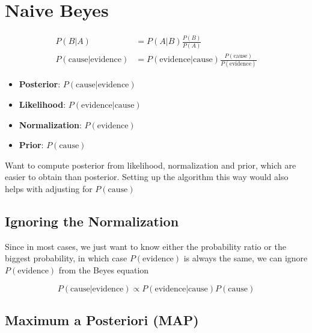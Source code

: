 \section{Naive Beyes}

  \begin{align}
    P\left( B | A \right)
      &= P\left( A | B \right) \frac{P\left( B \right)}{P\left( A \right)} \\
    P\left( \text{cause} | \text{evidence} \right)
      &= P\left( \text{evidence} | \text{cause} \right)\frac{P\left( \text{cause} \right)}{P\left( \text{evidence} \right)}
  \end{align}

  \begin{itemize}
    \item \textbf{Posterior}: $ P\left( \text{cause} | \text{evidence} \right) $
    \item \textbf{Likelihood}: $ P\left( \text{evidence} | \text{cause} \right) $
    \item \textbf{Normalization}: $ P\left( \text{evidence} \right) $
    \item \textbf{Prior}: $ P\left( \text{cause} \right) $
  \end{itemize}

  Want to compute posterior from likelihood, normalization and prior,
  which are easier to obtain than posterior. Setting up the algorithm this
  way would also helps with adjusting for $ P\left( \text{cause} \right) $

  \subsection{Ignoring the Normalization}

    Since in most cases, we just want to know either the probability ratio or
    the biggest probability, in which case $ P\left( \text{evidence} \right) $
    is always the same, we can ignore $ P\left( \text{evidence} \right) $
    from the Beyes equation

    \begin{equation}
      P\left( \text{cause} | \text{evidence} \right)
        \propto P\left( \text{evidence} | \text{cause} \right) P\left( \text{cause} \right)
    \end{equation}

  \subsection{Maximum a Posteriori (MAP)}

